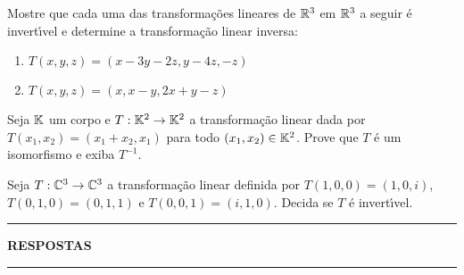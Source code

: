 \documentclass[12pt]{exam}
\begin{document}
\begin{exercicio}
  Mostre que cada uma das transforma\c{c}\~oes lineares de $\mathbb{R}^3$ em $\mathbb{R}^3$ a seguir \'e invert{\'\i}vel e determine a transforma\c{c}\~ao linear inversa:
  \begin{enumerate}[label={\alph*})]
    \item $T(x,y,z) = (x - 3y - 2z, y - 4z, -z)$

    \item $T(x,y,z) = (x, x - y, 2x + y -z)$
  \end{enumerate}
\end{exercicio}

\begin{exercicio}
  Seja $\mathbb{K}$ um corpo e $T : \mathbb{K}^2 \to \mathbb{K}^2$ a transforma\c{c}\~ao linear dada por $T(x_1,x_2) = (x_1 + x_2, x_1)$ para todo $(x_1,x_2) \in \mathbb{K}^2$. Prove que $T$ \'e um isomorfismo e exiba $T^{-1}$.
\end{exercicio}

\begin{exercicio}
  Seja $T : \mathbb{C}^3 \to \mathbb{C}^3$ a transforma\c{c}\~ao linear definida por $T(1,0,0) = (1,0,i)$, $T(0,1,0) = (0,1,1)$ e $T(0,0,1) = (i,1,0)$. Decida se $T$ \'e invert{\'\i}vel.
\end{exercicio}

\newpage
{}
\hrule
\begin{center}
  {\large\bf RESPOSTAS}
\end{center}
\hrule

\end{document}
